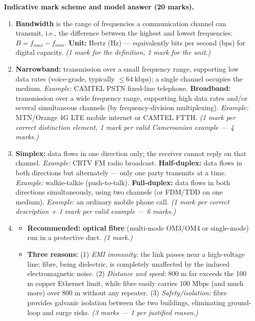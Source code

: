 \documentclass[11pt]{article}
\newcounter{popsec}
\newcounter{popsub}
\newcommand{\courssub}[1]{%
  \stepcounter{popsub}%
  \par\vspace{9pt}\noindent{\popxbold\fontsize{11.5}{13}\selectfont\color{popink}{\color{poporange}\thepopsec.\thepopsub}\hspace{6pt}#1}\par\nopagebreak\vspace{4pt}
}
\begin{document}
\courssub{I prepare for the GCE}

\begin{corrige}
\textbf{Indicative mark scheme and model answer (20 marks).}

\begin{enumerate}
\item[a)] \textbf{Bandwidth} is the range of frequencies a communication channel can transmit, i.e., the difference between the highest and lowest frequencies: $B = f_{max} - f_{min}$. \textbf{Unit:} Hertz (Hz) — equivalently bits per second (bps) for digital capacity. \emph{(1 mark for the definition, 1 mark for the unit.)}
\item[b)] \textbf{Narrowband:} transmission over a small frequency range, supporting low data rates (voice-grade, typically $\le 64\ \mathrm{kbps}$); a single channel occupies the medium. \emph{Example:} CAMTEL PSTN fixed-line telephone. \textbf{Broadband:} transmission over a wide frequency range, supporting high data rates and/or several simultaneous channels (by frequency-division multiplexing). \emph{Example:} MTN/Orange 4G LTE mobile internet or CAMTEL FTTH. \emph{(1 mark per correct distinction element, 1 mark per valid Cameroonian example — 4 marks.)}
\item[c)] \textbf{Simplex:} data flows in one direction only; the receiver cannot reply on that channel. \emph{Example:} CRTV FM radio broadcast. \textbf{Half-duplex:} data flows in both directions but alternately — only one party transmits at a time. \emph{Example:} walkie-talkie (push-to-talk). \textbf{Full-duplex:} data flows in both directions simultaneously, using two channels (or FDM/TDD on one medium). \emph{Example:} an ordinary mobile phone call. \emph{(1 mark per correct description + 1 mark per valid example — 6 marks.)}
\item[d)]
\begin{itemize}
\item[i)] \textbf{Recommended: optical fibre} (multi-mode OM3/OM4 or single-mode) run in a protective duct. \emph{(1 mark.)}
\item[ii)] \textbf{Three reasons:} (1) \emph{EMI immunity:} the link passes near a high-voltage line; fibre, being dielectric, is completely unaffected by the induced electromagnetic noise. (2) \emph{Distance and speed:} 800 m far exceeds the 100 m copper Ethernet limit, while fibre easily carries 100 Mbps (and much more) over 800 m without any repeater. (3) \emph{Safety/isolation:} fibre provides galvanic isolation between the two buildings, eliminating ground-loop and surge risks. \emph{(3 marks — 1 per justified reason.)}

\end{itemize}
\end{enumerate}
\end{corrige}
\end{document}
